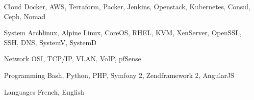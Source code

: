 

\begin{cvskills}

  \cvskill
    {Cloud} %
    {Docker, AWS, Terraform, Packer, Jenkins, Openstack, Kubernetes, Consul, Ceph, Nomad} %

  \cvskill
    {System} %
    {Archlinux, Alpine Linux, CoreOS, RHEL, KVM, XenServer, OpenSSL, SSH, DNS, SystemV, SystemD} %

  \cvskill
    {Network} %
    {OSI, TCP/IP, VLAN, VoIP, pfSense} %

  \cvskill
    {Programming} %
    {Bash, Python, PHP, Symfony 2, Zendframework 2, AngularJS} %

  \cvskill
    {Languages} %
    {French, English} %

\end{cvskills}
